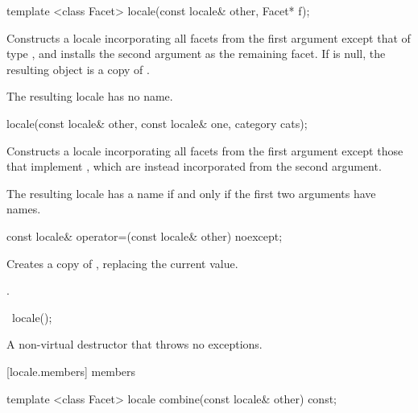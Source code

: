 %
\begin{itemdecl}
template <class Facet> locale(const locale& other, Facet* f);
\end{itemdecl}

\begin{itemdescr}
\pnum
\effects
Constructs a locale incorporating all facets from the first
argument except that of type
,
and installs the second argument as the remaining facet.
If 
is null, the resulting object is a copy of .

\pnum
\remarks
The resulting locale has no name.
\end{itemdescr}

%
\begin{itemdecl}
locale(const locale& other, const locale& one, category cats);
\end{itemdecl}

\begin{itemdescr}
\pnum
\effects
Constructs a locale incorporating all facets from the first argument
except those that implement
,
which are instead incorporated from the second argument.

\pnum
\remarks
The resulting locale has a name if and only if the first two arguments
have names.
\end{itemdescr}

%
\begin{itemdecl}
const locale& operator=(const locale& other) noexcept;
\end{itemdecl}

\begin{itemdescr}
\pnum
\effects
Creates a copy of , replacing the current value.

\pnum
\returns
{}.
\end{itemdescr}

%
\begin{itemdecl}
~locale();
\end{itemdecl}

\begin{itemdescr}
\pnum
A non-virtual destructor that throws no exceptions.
\end{itemdescr}

[locale.members]{ members}

%
\begin{itemdecl}
template <class Facet> locale combine(const locale& other) const;
\end{itemdecl}

